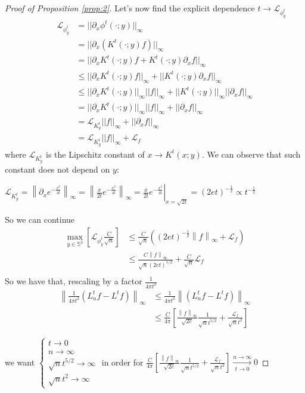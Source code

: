 \documentclass{article} %
\newcommand{\norm}[1]{\left\lVert#1\right\rVert}
\begin{document}
\begin{proof}[Proof of Proposition \ref{prop:2}]
Let's now find the explicit dependence $t\rightarrow \mathcal L_{\phi^t_y}$
\begin{align*}
	\mathcal L_{\phi^t_y} &= ||\partial_x\phi^t(\cdot;y)||_\infty\\&
	= ||\partial_x\left(K^t(\cdot;y)f\right)||_\infty\\&
	= ||\partial_x K^t(\cdot;y)f + K^t(\cdot;y)\partial_x f||_\infty\\&
	\leq ||\partial_x K^t(\cdot;y)f||_\infty + ||K^t(\cdot;y)\partial_x f||_\infty\\&
	\leq  ||\partial_x K^t(\cdot;y)||_\infty||f||_\infty + ||K^t(\cdot;y)||_\infty||\partial_x f||_\infty\\&
	= ||\partial_x K^t(\cdot;y)||_\infty||f||_\infty + ||\partial_x f||_\infty\\&
	= \mathcal L_{K^t_y} ||f||_\infty + ||\partial_xf||_\infty\\&
	= \mathcal L_{K^t_y} ||f||_\infty + \mathcal L_f
\end{align*}
where $\mathcal L_{K^t_y}$ is the Lipschitz constant of $x\rightarrow K^t(x;y)$. We can observe that such constant does not depend on $y$:

$\mathcal L_{K^t_y} = \norm{\partial_x e^{-\frac{x^2}{4t}}}_\infty = \norm{\frac{x}{2t}e^{-\frac{x^2}{4t}}}_\infty = \left. \frac{x}{2t}e^{-\frac{x^2}{4t}}\right|_{x=\sqrt{2t}}=(2et)^{-\frac{1}{2}}\propto t ^ {-\frac{1}{2}}$

So we can continue
$$\begin{aligned}
	\max _{y\in \mathbb S^2} \left[  \mathcal L_{\phi^t_y} \frac{C}{\sqrt{n}} \right]
	&\leq  \frac{C}{\sqrt{n}} \left( (2et)^{-\frac{1}{2}} \norm{f}_\infty + \mathcal L_f \right)\\
	&\leq \frac{C\norm{f}_\infty}{\sqrt{n}(2et)^{1/2}} +   \frac{C}{\sqrt{n}}\mathcal L_f\\
\end{aligned}$$
So we have that, rescaling by a factor $\frac{1}{4\pi t^2}$
\begin{align*}
	\norm{\frac{1}{4\pi t^2}\left(L_n^tf-L^tf\right)}_\infty&\leq \frac{1}{4\pi t^2}\norm{\left(L_n^tf-L^tf\right)}_\infty \\
	&\leq \frac{C}{4\pi}\left[\frac{\norm{f}_\infty}{\sqrt{2e}}\frac{1}{\sqrt{n}t^{5/2}} + \frac{\mathcal L_f}{\sqrt{n}t^2}\right]
\end{align*}

we want $\begin{cases}
t \rightarrow 0\\
n \rightarrow \infty\\
\sqrt{n}t^{5/2} \rightarrow \infty\\
\sqrt{n}t^2 \rightarrow \infty
\end{cases}$ in order for $ \frac{C}{4\pi}\left[\frac{\norm{f}_\infty}{\sqrt{2e}}\frac{1}{\sqrt{n}t^{5/2}} + \frac{\mathcal L_f}{\sqrt{n}t^2}\right] \xrightarrow[t\to 0 ]{n\to\infty}0$


\end{proof}
\end{document}
